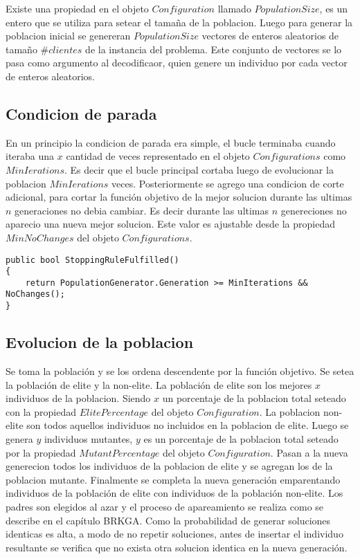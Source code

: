 Existe una propiedad en el objeto $Configuration$ llamado $PopulationSize$, es un entero que se utiliza para setear el tamaña de la poblacion. Luego para generar la poblacion inicial se genereran $PopulationSize$ vectores de enteros aleatorios de tamaño $\#clientes$ de la instancia del problema. Este conjunto de vectores se lo pasa como argumento al decodificaor, quien genere un individuo por cada vector de enteros aleatorios.

\subsection{Condicion de parada}

En un principio la condicion de parada era simple, el bucle terminaba cuando iteraba una $x$ cantidad de veces representado en el objeto $Configurations$ como $MinIerations$. Es decir que el bucle principal cortaba luego de evolucionar la poblacion $MinIerations$ veces. Posteriormente se agrego una condicion de corte adicional, para cortar la función objetivo de la mejor solucion durante las ultimas $n$ generaciones no debia cambiar. Es decir durante las ultimas $n$ genereciones no aparecio una nueva mejor solucion. Este valor es ajustable desde la propiedad $MinNoChanges$ del objeto $Configurations$.

\begin{lstlisting}
public bool StoppingRuleFulfilled()
{ 
    return PopulationGenerator.Generation >= MinIterations && NoChanges();
}
\end{lstlisting}

\subsection{Evolucion de la poblacion}

Se toma la población y se los ordena descendente por la función objetivo. Se setea la población de elite y la non-elite. La población de elite son los mejores $x$ individuos de la poblacion. Siendo $x$ un porcentaje de la poblacion total seteado con la propiedad $ElitePercentage$ del objeto $Configuration$. La poblacion non-elite son todos aquellos individuos no incluidos en la poblacion de elite. Luego se genera $y$ individuos mutantes, $y$ es un porcentaje de la poblacion total seteado por la propiedad $MutantPercentage$ del objeto $Configuration$. Pasan a la nueva generecion todos los individuos de la poblacion de elite y se agregan los de la poblacion mutante. Finalmente se completa la nueva generación emparentando individuos de la población de elite con individuos de la población non-elite. Los padres son elegidos al azar y el proceso de apareamiento se realiza como se describe en el capítulo BRKGA. Como la probabilidad de generar soluciones identicas es alta, a modo de no repetir soluciones, antes de insertar el individuo resultante se verifica que no exista otra solucion identica en la nueva generación.

